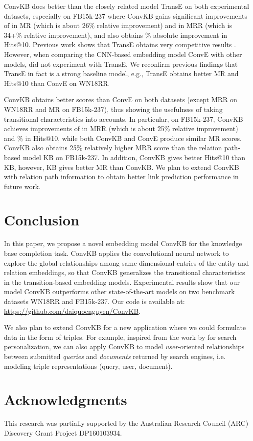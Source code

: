 \documentclass[11pt,a4paper]{article}
\begin{document}
ConvKB does better than the closely related model TransE on both experimental datasets, especially on  FB15k-237 where ConvKB gains significant improvements of  in MR (which is  about 26\% relative improvement) and  in MRR (which is   34+\% relative improvement),  and also obtains \% absolute   improvement in Hits@10. 
Previous work shows that TransE obtains very competitive results \cite{lin-EtAl:2015:EMNLP1,nickel2016holographic,Trouillon2016,Nguyen2016}. 
However, when comparing  the CNN-based embedding model ConvE  with other models, 
\citet{Dettmers2017} did not experiment with TransE.   
We reconfirm previous findings that TransE in fact is a strong baseline model, e.g., TransE obtains better MR and Hits@10 than ConvE on WN18RR.

ConvKB   obtains  better scores than ConvE on both  datasets (except  MRR  on WN18RR and MR on FB15k-237), thus showing the usefulness of taking transitional characteristics into accounts.  In particular, on   FB15k-237,  ConvKB achieves improvements of  in MRR (which is about 25\% relative improvement) and \% in Hits@10, while both ConvKB and ConvE produce similar MR scores.  ConvKB also obtains  25\% relatively higher MRR score than the relation path-based model KB on FB15k-237. In addition, ConvKB  gives better  Hits@10 than KB, however, KB gives better MR than ConvKB. We  plan to   extend ConvKB with relation path information to obtain better  link prediction performance  in future work.



\section{Conclusion}
In this paper, we propose a novel embedding model ConvKB for the knowledge base completion task.
ConvKB applies the convolutional neural network to explore the global relationships among same dimensional entries of the entity and relation embeddings, so that ConvKB generalizes the transitional characteristics in the transition-based embedding models.
Experimental results show that our  model ConvKB outperforms other state-of-the-art models on two benchmark datasets WN18RR and FB15k-237.  Our code is available at: \url{https://github.com/daiquocnguyen/ConvKB}.


We also plan to extend ConvKB for a new application where we could formulate data in the form of triples. For example, inspired from the work by \citet{Vu-etal-ECIR2017} for search  personalization,  we can also  apply ConvKB to model  \textit{user}-oriented relationships between submitted 
\textit{queries} and \textit{documents} returned by  search engines, i.e. modeling triple representations (query, user, document). 

\section*{Acknowledgments}
This research was partially supported by the Australian Research Council (ARC) Discovery Grant Project DP160103934.




\end{document}
